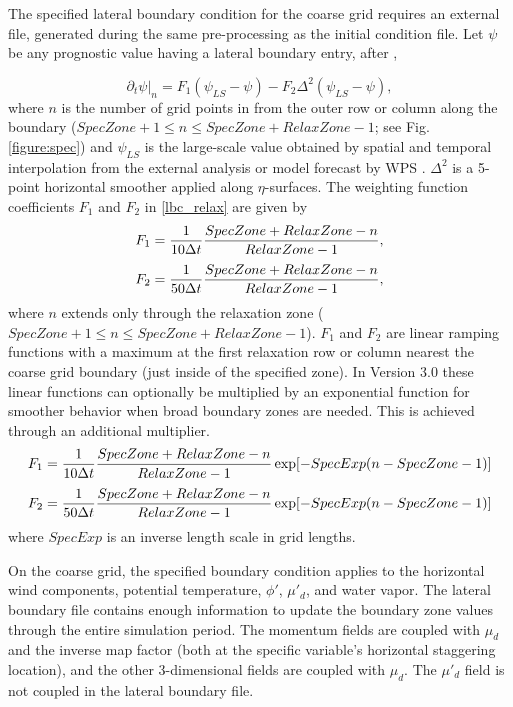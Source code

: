 The specified lateral boundary condition for the coarse grid 
requires an external file, generated
during the same pre-processing as the initial condition file.
Let $\psi$ be any prognostic value having a lateral boundary entry, after \cite{daviesturner77},

\begin{equation}
\partial_t \psi \big|_n = F_1(\psi_{LS} - \psi) - F_2 \Delta^2(\psi_{LS} - \psi),
\label{lbc_relax}
\end{equation}
\noindent where $n$ is the number of grid points in from the outer row or column along the boundary
($SpecZone + 1 \leq n \leq SpecZone + RelaxZone - 1$; see Fig. \ref{figure:spec}) 
and $\psi_{LS}$ is the large-scale value obtained by spatial and temporal interpolation from the external analysis or model forecast by WPS .  $\Delta^2$
is a 5-point horizontal smoother applied along $\eta$-surfaces.
The weighting function
coefficients $F_1$ and $F_2$ in \eqref{lbc_relax} are given by
\begin{equation}
F_1 = {1 \over {10 \Delta t }} {{SpecZone + RelaxZone - n} \over {RelaxZone - 1}},
\notag
\end{equation}
\begin{equation}
F_2 = {1 \over {50 \Delta t }} {{SpecZone + RelaxZone - n} \over {RelaxZone - 1}},
\notag
\end{equation}
\noindent where $n$ extends only through the relaxation zone 
($SpecZone + 1 \leq n \leq SpecZone + RelaxZone - 1$).
$F_1$ and $F_2$ are
linear ramping functions with a maximum at the first relaxation row or column 
nearest the coarse grid boundary (just inside of the specified zone).  
In Version 3.0 these linear functions can optionally be multiplied by an
exponential function for smoother behavior when broad boundary zones are
needed. This is achieved through an additional multiplier.
\begin{equation}
F_1 = {1 \over {10 \Delta t }} {{SpecZone + RelaxZone - n} \over {RelaxZone - 1}}
\exp [ - SpecExp ( n - SpecZone - 1)]
\notag
\end{equation}
\begin{equation}
F_2 = {1 \over {50 \Delta t }} {{SpecZone + RelaxZone - n} \over {RelaxZone - 1}}
\exp [ - SpecExp ( n - SpecZone - 1)]
\notag
\end{equation}
where $SpecExp$ is an inverse length scale in grid lengths.

On the coarse grid, the specified boundary condition applies to 
the horizontal wind components, potential temperature, $\phi'$, $\mu'_d$, and water vapor. 
The lateral boundary file contains enough information to update the
boundary zone values through the entire simulation period.  The momentum fields are 
coupled with $\mu_d$ and the inverse map factor (both at the specific variable's
horizontal staggering location), and the other 3-dimensional fields are coupled with
$\mu_d$.  The $\mu'_d$ field is not coupled in the lateral boundary file.

